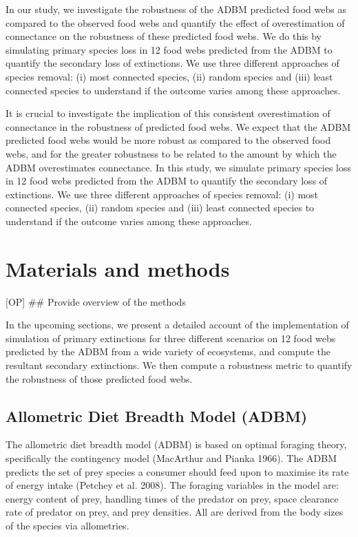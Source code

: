 \documentclass{article}
\begin{document}
In our study, we investigate the robustness of the ADBM predicted food
webs as compared to the observed food webs and quantify the effect of
overestimation of connectance on the robustness of these predicted food
webs. We do this by simulating primary species loss in 12 food webs
predicted from the ADBM to quantify the secondary loss of extinctions.
We use three different approaches of species removal: (i) most connected
species, (ii) random species and (iii) least connected species to
understand if the outcome varies among these approaches.

It is crucial to investigate the implication of this consistent
overestimation of connectance in the robustness of predicted food webs.
We expect that the ADBM predicted food webs would be more robust as
compared to the observed food webs, and for the greater robustness to be
related to the amount by which the ADBM overestimates connectance. In
this study, we simulate primary species loss in 12 food webs predicted
from the ADBM to quantify the secondary loss of extinctions. We use
three different approaches of species removal: (i) most connected
species, (ii) random species and (iii) least connected species to
understand if the outcome varies among these approaches.

\hypertarget{materials-and-methods}{%
\section{Materials and methods}\label{materials-and-methods}}

{[}OP{]} \#\# Provide overview of the methods

In the upcoming sections, we present a detailed account of the
implementation of simulation of primary extinctions for three different
scenarios on 12 food webs predicted by the ADBM from a wide variety of
ecosystems, and compute the resultant secondary extinctions. We then
compute a robustness metric to quantify the robustness of those
predicted food webs.

\hypertarget{allometric-diet-breadth-model-adbm}{%
\subsection{Allometric Diet Breadth Model
(ADBM)}\label{allometric-diet-breadth-model-adbm}}

The allometric diet breadth model (ADBM) is based on optimal foraging
theory, specifically the contingency model (MacArthur and Pianka 1966).
The ADBM predicts the set of prey species a consumer should feed upon to
maximise its rate of energy intake (Petchey et al. 2008). The foraging
variables in the model are: energy content of prey, handling times of
the predator on prey, space clearance rate of predator on prey, and prey
densities. All are derived from the body sizes of the species via
allometries.
\end{document}
